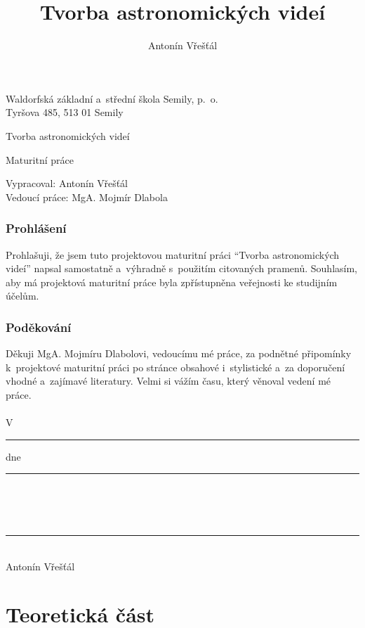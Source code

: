 \documentclass[12pt,a4paper,titlepage]{article}
\author{Antonín Vřešťál}
\title{Tvorba astronomických videí}
\begin{document}
\begin{titlepage}
	\begin{center}
		Waldorfská základní a~střední škola Semily, p.\  o.\\
		Tyršova 485, 513 01 Semily
		\vspace*{1cm}
 
		\vfill		

		\Huge
		Tvorba astronomických videí
 
		\normalsize
		\vspace{0.5cm}
		Maturitní práce 	 
		 
		\vfill		
	\end{center}
	Vypracoval: Antonín Vřešťál\\
	Vedoucí práce: MgA. Mojmír Dlabola\\
 \end{titlepage}
\newpage
\section*{Prohlášení}
Prohlašuji, že jsem tuto projektovou maturitní práci \enquote{Tvorba astronomických videí} napsal samostatně a~výhradně s~použitím citovaných pramenů. Souhlasím, aby má projektová maturitní práce byla zpřístupněna veřejnosti ke studijním účelům.
\section*{Poděkování}
Děkuji MgA. Mojmíru Dlabolovi, vedoucímu mé práce, za podnětné připomínky k~projektové maturitní práci po stránce obsahové i~stylistické a~za doporučení vhodné a~zajímavé literatury. Velmi si vážím času, který věnoval vedení mé práce.\\
\\
V \hspace{0.05cm} \rule[-3pt]{4cm}{0.5pt} \hspace{0.05cm} dne \hspace{0.05cm} \rule[-3pt]{4cm}{0.5pt}\\
\\
\\
\hspace{0.5cm} \rule[-3pt]{5.5cm}{0.5pt}\\
\indent \indent Antonín Vřešťál\\

\newpage
\tableofcontents
\newpage
\part{Teoretická část}
\end{document}
